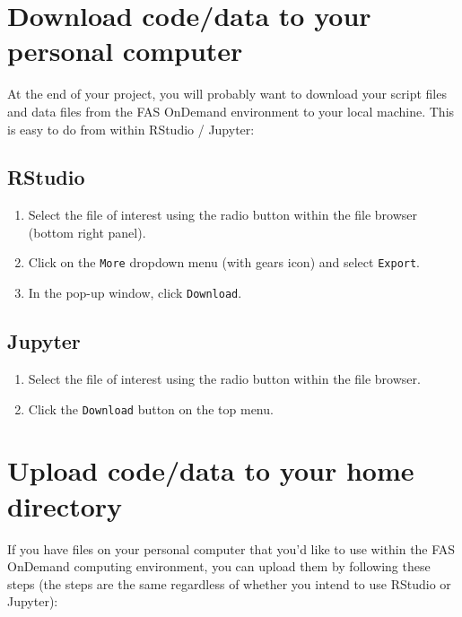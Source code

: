 \documentclass[]{book}
\providecommand{\tightlist}{%
  \setlength{\itemsep}{0pt}\setlength{\parskip}{0pt}}
\begin{document}
\hypertarget{download-codedata-to-your-personal-computer}{%
\chapter{Download code/data to your personal computer}\label{download-codedata-to-your-personal-computer}}

At the end of your project, you will probably want to download your script files and data files from the FAS OnDemand environment to your local machine. This is easy to do from within RStudio / Jupyter:

\hypertarget{rstudio-1}{%
\section{RStudio}\label{rstudio-1}}

\begin{enumerate}
\def\labelenumi{\arabic{enumi}.}
\tightlist
\item
  Select the file of interest using the radio button within the file browser (bottom right panel).
\item
  Click on the \texttt{More} dropdown menu (with gears icon) and select \texttt{Export}.
\item
  In the pop-up window, click \texttt{Download}.
\end{enumerate}

\hypertarget{jupyter-1}{%
\section{Jupyter}\label{jupyter-1}}

\begin{enumerate}
\def\labelenumi{\arabic{enumi}.}
\tightlist
\item
  Select the file of interest using the radio button within the file browser.
\item
  Click the \texttt{Download} button on the top menu.
\end{enumerate}

\hypertarget{upload-codedata-to-your-home-directory}{%
\chapter{Upload code/data to your home directory}\label{upload-codedata-to-your-home-directory}}

If you have files on your personal computer that you'd like to use within the FAS OnDemand computing environment, you can upload them by following these steps (the steps are the same regardless of whether you intend to use RStudio or Jupyter):
\end{document}
